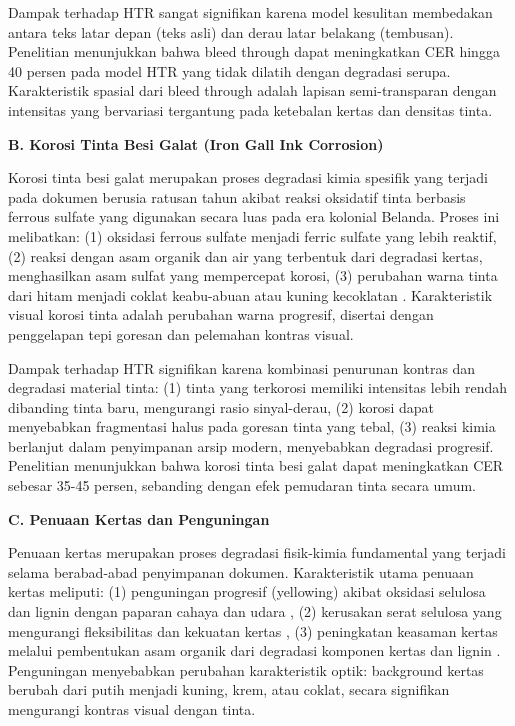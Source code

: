 Dampak terhadap HTR sangat signifikan karena model kesulitan membedakan antara teks latar depan (teks asli) dan derau latar belakang (tembusan). Penelitian \citep{gatos2006} menunjukkan bahwa bleed through dapat meningkatkan CER hingga 40 persen pada model HTR yang tidak dilatih dengan degradasi serupa. Karakteristik spasial dari bleed through adalah lapisan semi-transparan dengan intensitas yang bervariasi tergantung pada ketebalan kertas dan densitas tinta.

\vspace{0.5ex}
\noindent\textbf{B. Korosi Tinta Besi Galat (Iron Gall Ink Corrosion)}

Korosi tinta besi galat merupakan proses degradasi kimia spesifik yang terjadi pada dokumen berusia ratusan tahun akibat reaksi oksidatif tinta berbasis ferrous sulfate yang digunakan secara luas pada era kolonial Belanda. Proses ini melibatkan: (1) oksidasi ferrous sulfate menjadi ferric sulfate yang lebih reaktif, (2) reaksi dengan asam organik dan air yang terbentuk dari degradasi kertas, menghasilkan asam sulfat yang mempercepat korosi, (3) perubahan warna tinta dari hitam menjadi coklat keabu-abuan atau kuning kecoklatan \citep{neevel1995, krekel1999}. Karakteristik visual korosi tinta adalah perubahan warna progresif, disertai dengan penggelapan tepi goresan dan pelemahan kontras visual.

Dampak terhadap HTR signifikan karena kombinasi penurunan kontras dan degradasi material tinta: (1) tinta yang terkorosi memiliki intensitas lebih rendah dibanding tinta baru, mengurangi rasio sinyal-derau, (2) korosi dapat menyebabkan fragmentasi halus pada goresan tinta yang tebal, (3) reaksi kimia berlanjut dalam penyimpanan arsip modern, menyebabkan degradasi progresif. Penelitian menunjukkan bahwa korosi tinta besi galat dapat meningkatkan CER sebesar 35-45 persen, sebanding dengan efek pemudaran tinta secara umum.

\vspace{0.5ex}
\noindent\textbf{C. Penuaan Kertas dan Penguningan}

Penuaan kertas merupakan proses degradasi fisik-kimia fundamental yang terjadi selama berabad-abad penyimpanan dokumen. Karakteristik utama penuaan kertas meliputi: (1) penguningan progresif (yellowing) akibat oksidasi selulosa dan lignin dengan paparan cahaya dan udara \citep{reilly1993}, (2) kerusakan serat selulosa yang mengurangi fleksibilitas dan kekuatan kertas \citep{porck2000}, (3) peningkatan keasaman kertas melalui pembentukan asam organik dari degradasi komponen kertas dan lignin \citep{neevel1995}. Penguningan menyebabkan perubahan karakteristik optik: background kertas berubah dari putih menjadi kuning, krem, atau coklat, secara signifikan mengurangi kontras visual dengan tinta.

